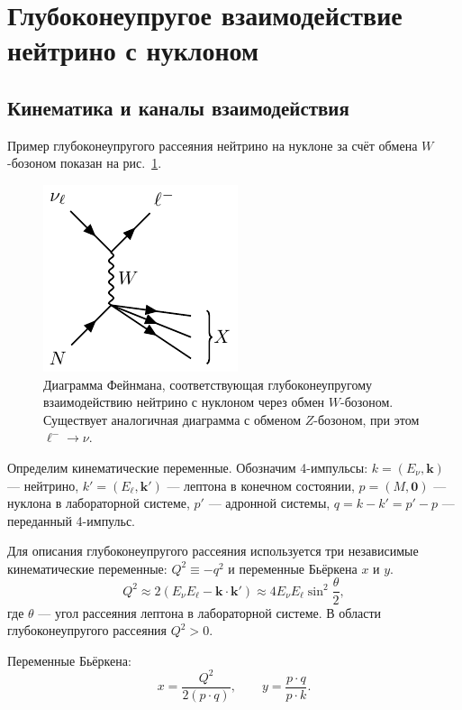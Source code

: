 \section{Глубоконеупругое взаимодействие нейтрино с нуклоном}
\label{sec:dis}
\subsection{Кинематика и каналы взаимодействия}

Пример глубоконеупругого рассеяния нейтрино на нуклоне за счёт обмена $W$-бозоном показан на рис.~\ref{fig:DIS}. 

\begin{figure}[!h]
\centering
\includegraphics[width=0.4\linewidth]{images/neutrino-nucleon-dis.pdf}
\caption{Диаграмма Фейнмана, соответствующая глубоконеупругому взаимодействию нейтрино с нуклоном через обмен $W$-бозоном. Существует аналогичная диаграмма с обменом $Z$-бозоном, при этом $\ell^- \to \nu$.}
\label{fig:DIS}
\end{figure}

Определим кинематические переменные. Обозначим 4-импульсы: 
$k = (E_\nu, \bm{k})$ — нейтрино, 
$k' = (E_\ell, \bm{k}')$ — лептона в конечном состоянии, 
$p = (M, \bm{0})$ — нуклона в лабораторной системе, 
$p'$ — адронной системы, 
$q = k - k' = p' - p$ — переданный 4-импульс.

Для описания глубоконеупругого рассеяния используется три независимые кинематические переменные: \( Q^2 \equiv -q^2\) и переменные Бьёркена \( x \) и \( y \).
\begin{equation}
  Q^2 \approx 2(E_\nu E_\ell - \bm{k} \cdot \bm{k}') \approx 4E_\nu E_\ell \sin^2\!\frac{\theta}{2},
\end{equation}
где \( \theta \) — угол рассеяния лептона в лабораторной системе. В области глубоконеупругого рассеяния \( Q^2 > 0 \).

Переменные Бьёркена:
\begin{equation}
  x = \frac{Q^2}{2(p \cdot q)}, 
  \qquad 
  y = \frac{p \cdot q}{p \cdot k}.
\end{equation}

